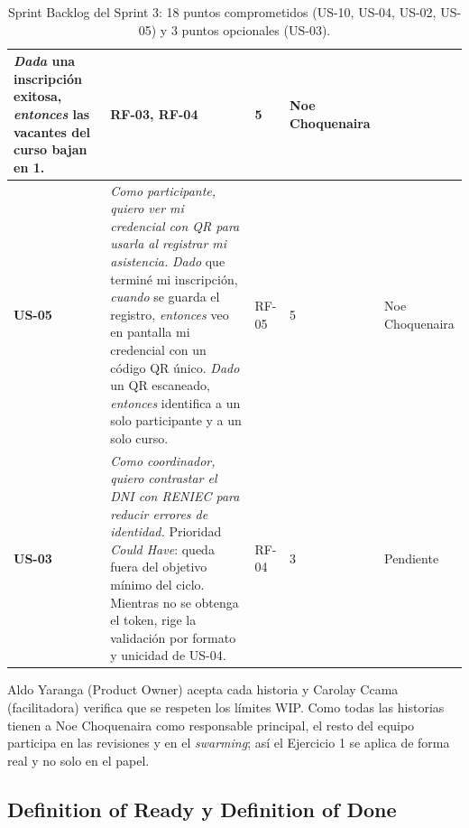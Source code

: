 \documentclass[11pt,a4paper]{article}
\begin{document}
\begin{table}[H]
\begin{tabularx}{\textwidth}{P{1.15cm}YP{1.7cm}P{0.9cm}P{1.9cm}}
\textit{Dada} una inscripción exitosa, \textit{entonces} las vacantes del curso bajan en 1. & RF-03, RF-04 & 5 & Noe Choquenaira \\
\midrule
\textbf{US-05} & \textit{Como participante, quiero ver mi credencial con QR para usarla al registrar mi asistencia.}\newline
\textit{Dado} que terminé mi inscripción, \textit{cuando} se guarda el registro, \textit{entonces} veo en pantalla mi credencial con un código QR único.\newline
\textit{Dado} un QR escaneado, \textit{entonces} identifica a un solo participante y a un solo curso. & RF-05 & 5 & Noe Choquenaira \\
\midrule
\textbf{US-03} & \textit{Como coordinador, quiero contrastar el DNI con RENIEC para reducir errores de identidad.}\newline
Prioridad \textit{Could Have}: queda fuera del objetivo mínimo del ciclo. Mientras no se obtenga el token, rige la validación por formato y unicidad de US-04. & RF-04 & 3 & Pendiente \\
\bottomrule
\end{tabularx}
\caption{Sprint Backlog del Sprint 3: 18 puntos comprometidos (US-10, US-04, US-02, US-05) y 3 puntos opcionales (US-03).}
\label{tab:sprint3}
\end{table}

Aldo Yaranga (Product Owner) acepta cada historia y Carolay Ccama (facilitadora) verifica que se respeten los límites WIP. Como todas las historias tienen a Noe Choquenaira como responsable principal, el resto del equipo participa en las revisiones y en el \textit{swarming}; así el Ejercicio 1 se aplica de forma real y no solo en el papel.

\subsection{Definition of Ready y Definition of Done}
\end{document}
